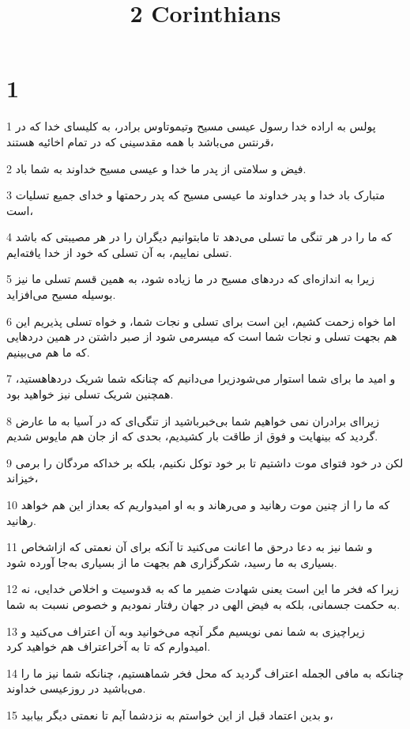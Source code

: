 

\title{2 Corinthians}


\chapter{1}

\par 1 پولس به اراده خدا رسول عیسی مسیح وتیموتاوس برادر، به کلیسای خدا که در قرنتس می‌باشد با همه مقدسینی که در تمام اخائیه هستند،
\par 2 فیض و سلامتی از پدر ما خدا و عیسی مسیح خداوند به شما باد.
\par 3 متبارک باد خدا و پدر خداوند ما عیسی مسیح که پدر رحمتها و خدای جمیع تسلیات است،
\par 4 که ما را در هر تنگی ما تسلی می‌دهد تا مابتوانیم دیگران را در هر مصیبتی که باشد تسلی نماییم، به آن تسلی که خود از خدا یافته‌ایم.
\par 5 زیرا به اندازه‌ای که دردهای مسیح در ما زیاده شود، به همین قسم تسلی ما نیز بوسیله مسیح می‌افزاید.
\par 6 اما خواه زحمت کشیم، این است برای تسلی و نجات شما، و خواه تسلی پذیریم این هم بجهت تسلی و نجات شما است که میسرمی شود از صبر داشتن در همین دردهایی که ما هم می‌بینیم.
\par 7 و امید ما برای شما استوار می‌شودزیرا می‌دانیم که چنانکه شما شریک دردهاهستید، همچنین شریک تسلی نیز خواهید بود.
\par 8 زیرا‌ای برادران نمی خواهیم شما بی‌خبرباشید از تنگی‌ای که در آسیا به ما عارض گردید که بینهایت و فوق از طاقت بار کشیدیم، بحدی که از جان هم مایوس شدیم.
\par 9 لکن در خود فتوای موت داشتیم تا بر خود توکل نکنیم، بلکه بر خداکه مردگان را برمی خیزاند،
\par 10 که ما را از چنین موت رهانید و می‌رهاند و به او امیدواریم که بعداز این هم خواهد رهانید.
\par 11 و شما نیز به دعا درحق ما اعانت می‌کنید تا آنکه برای آن نعمتی که ازاشخاص بسیاری به ما رسید، شکرگزاری هم بجهت ما از بسیاری به‌جا آورده شود.
\par 12 زیرا که فخر ما این است یعنی شهادت ضمیر ما که به قدوسیت و اخلاص خدایی، نه به حکمت جسمانی، بلکه به فیض الهی در جهان رفتار نمودیم و خصوص نسبت به شما.
\par 13 زیراچیزی به شما نمی نویسیم مگر آنچه می‌خوانید وبه آن اعتراف می‌کنید و امیدوارم که تا به آخراعتراف هم خواهید کرد.
\par 14 چنانکه به مافی الجمله اعتراف گردید که محل فخر شماهستیم، چنانکه شما نیز ما را می‌باشید در روزعیسی خداوند.
\par 15 و بدین اعتماد قبل از این خواستم به نزدشما آیم تا نعمتی دیگر بیابید،
